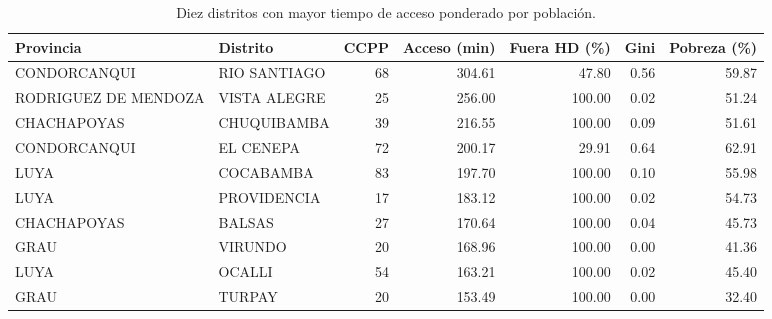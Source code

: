 \begin{table}[htbp]\centering
\caption{Diez distritos con mayor tiempo de acceso ponderado por poblaci\'on.}\label{tab:peores}
\begin{tabular}{llrrrrr}
\toprule
Provincia & Distrito & CCPP & Acceso (min) & Fuera HD (\%) & Gini & Pobreza (\%) \\
\midrule
CONDORCANQUI & RIO SANTIAGO & 68 & 304.61 & 47.80 & 0.56 & 59.87 \\
RODRIGUEZ DE MENDOZA & VISTA ALEGRE & 25 & 256.00 & 100.00 & 0.02 & 51.24 \\
CHACHAPOYAS & CHUQUIBAMBA & 39 & 216.55 & 100.00 & 0.09 & 51.61 \\
CONDORCANQUI & EL CENEPA & 72 & 200.17 & 29.91 & 0.64 & 62.91 \\
LUYA & COCABAMBA & 83 & 197.70 & 100.00 & 0.10 & 55.98 \\
LUYA & PROVIDENCIA & 17 & 183.12 & 100.00 & 0.02 & 54.73 \\
CHACHAPOYAS & BALSAS & 27 & 170.64 & 100.00 & 0.04 & 45.73 \\
GRAU & VIRUNDO & 20 & 168.96 & 100.00 & 0.00 & 41.36 \\
LUYA & OCALLI & 54 & 163.21 & 100.00 & 0.02 & 45.40 \\
GRAU & TURPAY & 20 & 153.49 & 100.00 & 0.00 & 32.40 \\
\bottomrule
\end{tabular}
\end{table}

